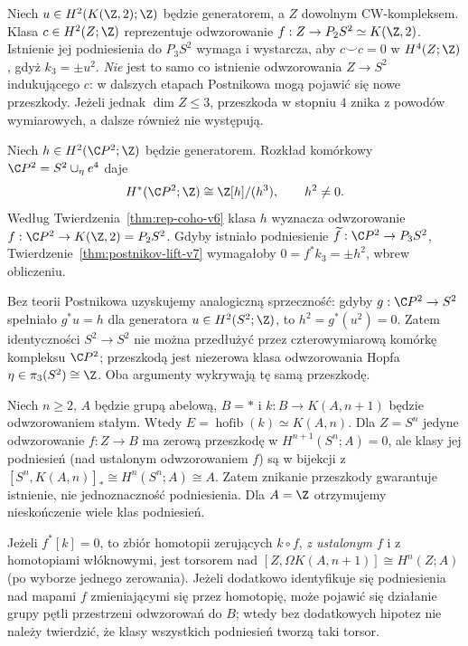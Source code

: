 \begin{przyklad}
Niech $u\in H^2(K(\Z,2);\Z)$ będzie generatorem,
a $Z$ dowolnym CW-kompleksem. Klasa
$c\in H^2(Z;\Z)$ reprezentuje odwzorowanie
$f:Z\to P_2S^2\simeq K(\Z,2)$. Istnienie jej
podniesienia do $P_3S^2$ wymaga i wystarcza,
aby $c\smile c=0$ w $H^4(Z;\Z)$, gdyż
$k_3=\pm u^2$. \emph{Nie} jest to samo co
istnienie odwzorowania $Z\to S^2$ indukującego $c$:
w dalszych etapach Postnikowa mogą pojawić się
nowe przeszkody. Jeżeli jednak $\dim Z\le3$,
przeszkoda w stopniu $4$ znika z powodów
wymiarowych, a dalsze również nie występują.
\end{przyklad}


\begin{przyklad}
\label{prz:postnikow-cp2-nie-ma-liftu}
Niech $h\in H^2(\C P^2;\Z)$ będzie generatorem.
Rozkład komórkowy $\C P^2=S^2\cup_\eta e^4$ daje
\[H^*(\C P^2;\Z)\cong\Z[h]/(h^3),\qquad h^2\ne0.\]
Według Twierdzenia~\ref{thm:rep-coho-v6} klasa $h$
wyznacza odwzorowanie $f:\C P^2\to K(\Z,2)=P_2S^2$.
Gdyby istniało podniesienie
$\widetilde f:\C P^2\to P_3S^2$,
Twierdzenie~\ref{thm:postnikov-lift-v7} wymagałoby
$0=f^*k_3=\pm h^2$, wbrew obliczeniu.

Bez teorii Postnikowa uzyskujemy analogiczną sprzeczność:
gdyby $g:\C P^2\to S^2$ spełniało $g^*u=h$
dla generatora $u\in H^2(S^2;\Z)$, to
$h^2=g^*(u^2)=0$. Zatem identyczności
$S^2\to S^2$ nie można przedłużyć przez
czterowymiarową komórkę kompleksu $\C P^2$;
przeszkodą jest niezerowa klasa odwzorowania Hopfa
$\eta\in\pi_3(S^2)\cong\Z$. Oba argumenty
wykrywają tę samą przeszkodę.
\end{przyklad}

\begin{przyklad}
Niech $n\ge2$, $A$ będzie grupą abelową,
$B=*$ i $k:B\to K(A,n+1)$ będzie odwzorowaniem stałym.
Wtedy $E=\operatorname{hofib}(k)\simeq K(A,n)$.
Dla $Z=S^n$ jedyne odwzorowanie $f:Z\to B$ ma zerową
przeszkodę w $H^{n+1}(S^n;A)=0$, ale klasy
jej podniesień (nad ustalonym odwzorowaniem $f$) są w bijekcji z
$[S^n,K(A,n)]_*\cong H^n(S^n;A)\cong A$.
Zatem znikanie przeszkody gwarantuje istnienie,
nie jednoznaczność podniesienia. Dla $A=\Z$
otrzymujemy nieskończenie wiele klas podniesień.
\end{przyklad}

\begin{uwaga}
Jeżeli $f^*[k]=0$, to zbiór homotopii
zerujących $k\circ f$, \emph{z ustalonym $f$}
i z homotopiami włóknowymi, jest torsorem
nad $[Z,\Omega K(A,n+1)]\cong H^n(Z;A)$
(po wyborze jednego zerowania). Jeżeli dodatkowo
identyfikuje się podniesienia nad mapami $f$
zmieniającymi się przez homotopię, może pojawić się
działanie grupy pętli przestrzeni odwzorowań do $B$;
wtedy bez dodatkowych hipotez nie należy twierdzić,
że klasy wszystkich podniesień tworzą taki torsor.
\end{uwaga}

